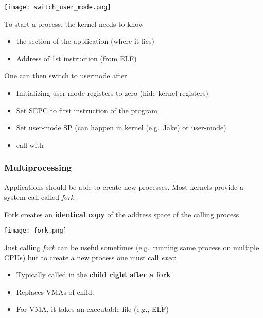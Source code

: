 \newpar{}
\begin{center}
    \texttt{[image: switch\_user\_mode.png]}
\end{center}
To start a process, the kernel needs to know
\begin{itemize}
    \item the  section of the application (where it lies)
    \item Address of 1st instruction (from ELF)
\end{itemize}
One can then switch to usermode after
\begin{itemize}
    \item Initializing user mode registers to zero (hide kernel registers)
    \item Set SEPC to first instruction of the program
    \item Set user-mode SP (can happen in kernel (e.g.\ Jake) or user-mode)
    \item call  with 
\end{itemize}

\subsubsection{Multiprocessing}
Applications should be able to create new processes. Most kernels provide a system call called \textit{fork}:

\newpar{}

Fork creates an \textbf{identical copy} of the address space of the calling process
\begin{center}
    \texttt{[image: fork.png]}
\end{center}

Just calling \textit{fork} can be useful sometimes (e.g.\ running same process on multiple CPUs) but to create a new process one must call \textit{exec}:

\begin{itemize}
    \item Typically called in the \textbf{child right after a fork}
    \item Replaces VMAs of child.
    \item For  VMA, it takes an executable file (e.g., ELF)
\end{itemize}

\newpar{}

